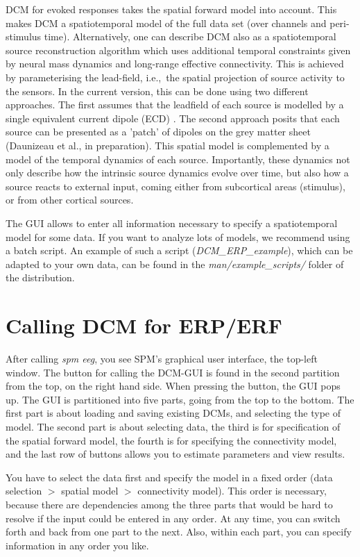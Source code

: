 DCM for evoked responses takes the spatial forward model into
account. This makes DCM a spatiotemporal model of the full data set
(over channels and peri-stimulus time). Alternatively, one can
describe DCM also as a spatiotemporal source reconstruction algorithm which uses
additional temporal constraints given by neural mass dynamics and
long-range effective connectivity. This is achieved by parameterising
the lead-field, i.e.,~the spatial projection of source 
activity to the sensors. In the current version, this can be done
using two different approaches. The first assumes that the leadfield
of each source is modelled by a single equivalent current dipole 
(ECD) \cite{sjk_dcm_erp}. The second approach posits that each source
can be presented as a 'patch' of dipoles on the grey matter sheet
(Daunizeau et al., in preparation). This spatial model is complemented
by a model of the temporal dynamics of each source. Importantly, these
dynamics not only describe how the intrinsic source dynamics evolve
over time, but also how a source reacts to external input, coming
either from subcortical areas (stimulus), or from other cortical
sources.

The GUI allows to enter all information necessary to specify a
spatiotemporal model for some data. If you want to analyze lots of
models, we recommend using a batch script. An example of such 
a script (\textit{DCM\_ERP\_example}), which can be adapted to your
own data, can be found in the \textit{man/example\_scripts/} folder of
the distribution.

\section{Calling DCM for ERP/ERF}
After calling \textit{spm eeg}, you see SPM's graphical user interface,
the top-left window. The button for calling the DCM-GUI is found
in the second partition from the top, on the right hand side. When
pressing the button, the GUI pops up. The GUI is partitioned into five 
parts, going from the top to the bottom. The first part is about
loading and saving existing DCMs, and selecting the type of model. The second part is about selecting
data, the third is for specification of the spatial forward model, the
fourth is for specifying the connectivity model, and the last row of
buttons allows you to estimate parameters and view results.

You have to select the data first and specify the model in
a fixed order (data selection $>$ spatial model $>$
connectivity model). This order is necessary, because there are
dependencies among the three parts that would be hard to resolve
if the input could be entered in any order. At any time, you can switch forth and back from one part to
the next. Also, within each part, you can specify information in any
order you like.  

